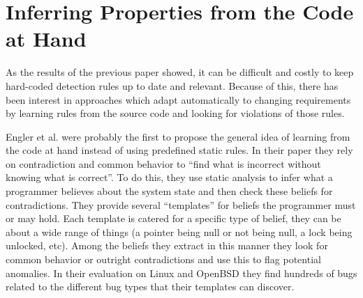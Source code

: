 \section{Inferring Properties from the Code at Hand}


As the results of the previous paper showed, it can be difficult and costly to keep hard-coded detection rules up to date and relevant.
Because of this, there has been interest in approaches which adapt automatically to changing requirements by learning rules from the source code and looking for violations of those rules.


Engler et al. \cite{engler2001bugs} were probably the first to propose the general idea of learning from the code at hand instead of using predefined static rules.
In their paper they rely on contradiction and common behavior to ``find what is incorrect without knowing what is correct''.
To do this, they use static analysis to infer what a programmer believes about the system state and then check these beliefs for contradictions.
They provide several ``templates'' for beliefs the programmer must or may hold.
Each template is catered for a specific type of belief, they can be about a wide range of things (a pointer being null or not being null, a lock being unlocked, etc).
Among the beliefs they extract in this manner they look for common behavior or outright contradictions and use this to flag potential anomalies.
In their evaluation on Linux and OpenBSD they find hundreds of bugs related to the different bug types that their templates can discover.

